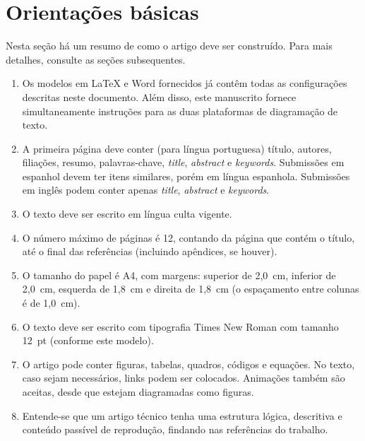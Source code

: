\documentclass[12pt, a4paper, twoside, onecolumn]{article}
\begin{document}
\section{Orientações básicas}

Nesta seção há um resumo de como o artigo deve ser construído. Para mais detalhes, consulte as seções subsequentes.

\vspace{-8pt}
\begin{enumerate} \itemsep=2pt
    \item Os modelos em LaTeX e Word fornecidos já contêm todas as configurações descritas neste documento. Além disso, este manuscrito fornece simultaneamente instruções para as duas plataformas de diagramação de texto.
	\item A primeira página deve conter (para língua portuguesa) título, autores, filiações, resumo, palavras-chave, \textit{title}, \textit{abstract} e \textit{keywords}.
	Submissões em espanhol devem ter itens similares, porém em língua espanhola. Submissões em inglês podem conter apenas \textit{title}, \textit{abstract} e \textit{keywords}.
	\item O texto deve ser escrito em língua culta vigente.
	\item O número máximo de páginas é 12, contando da página que contém o título, até o final das referências (incluindo apêndices, se houver).
	\item O tamanho do papel é A4, com margens: superior de 2,0~cm, inferior de 2,0~cm, esquerda de 1,8~cm e direita de 1,8~cm (o espaçamento entre colunas é de 1,0~cm).
	\item O texto deve ser escrito com tipografia Times New Roman com tamanho 12~pt (conforme este modelo).
	\item O artigo pode conter figuras, tabelas, quadros, códigos e equações. No texto, caso sejam necessários, links podem ser colocados. Animações também são aceitas, desde que estejam diagramadas como figuras.
	\item Entende-se que um artigo técnico tenha uma estrutura lógica, descritiva e conteúdo passível de reprodução, findando nas referências do trabalho.
\end{enumerate}


\end{document}
